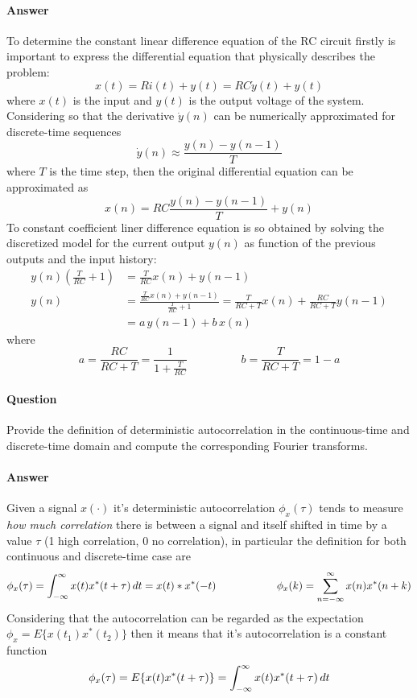 	
	\paragraph{Answer} To determine the constant linear difference equation of the RC circuit firstly is important to express the differential equation that physically describes the problem:
	\[ x(t) = Ri(t) + y(t) = RC \dot y(t) + y(t) \]
	where $x(t)$ is the input and $y(t)$ is the output voltage of the system. Considering so that the derivative $\dot y(n)$ can be numerically approximated for discrete-time sequences
	\[ \dot y(n) \approx \frac{y(n)-y(n-1)}{T} \]
	where $T$ is the time step, then the original differential equation can be approximated as
	\[ x(n) = RC \frac{y(n)-y(n-1)}{T} + y(n) \]
	To constant coefficient liner difference equation is so obtained by solving the discretized model for the current output $y(n)$ as function of the previous outputs and the input history:
	\begin{align*}
		y(n) \left( \frac T{RC} + 1\right) & = \frac T{RC} x(n) + y(n-1) \\
		y(n) & = \frac{\frac T{RC} x(n) + y(n-1) }{\frac T{RC} + 1} = \frac{T }{RC+T} x(n) + \frac{RC}{RC+T}y(n-1) \\ 
		& = a \, y(n-1) + b\, x(n)
	\end{align*}
	where 
	\[ a = \frac{RC}{RC+T} = \frac{1}{1 + \frac{T}{RC}} \hspace{2cm} b = \frac{T}{RC+T} = 1-a \]
	
\newquestion
	\paragraph{Question} Provide the definition of deterministic autocorrelation in the continuous-time and discrete-time domain and compute the corresponding Fourier transforms.
	
	\paragraph{Answer} Given a signal $x(\cdot)$ it's deterministic autocorrelation $\phi_x(\tau)$ tends to measure \textit{how much correlation} there is between a signal and itself shifted in time by a value $\tau$ (1 high correlation, 0 no correlation), in particular the definition for both continuous and discrete-time case are
	\[ \phi_x(\tau) = \int_{-\infty}^\infty x(t)x^*(t+\tau)\, dt =x(t)*x^*(-t) \hspace{2cm} \phi_x(k) = \sum_{n=-\infty}^\infty x(n) x^*(n+k) \]
	Considering that the autocorrelation can be regarded as the expectation $\phi_x = E\{x(t_1)x^*(t_2)\}$ then it means that it's autocorrelation is a constant function
	\[ \phi_x(\tau) = E\{ x(t) x^*(t+\tau) \} = \int_{-\infty}^\infty x(t)x^*(t+\tau) \, dt\]
	
